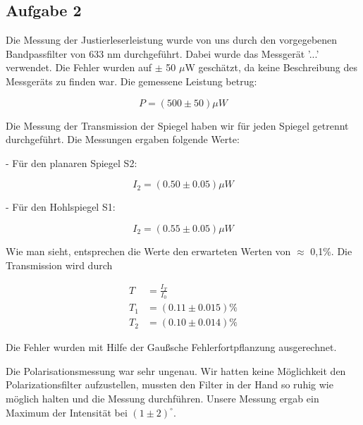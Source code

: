 \subsection{Aufgabe 2}

Die Messung der Justierleserleistung wurde von uns durch den vorgegebenen Bandpassfilter von 633 nm durchgeführt. Dabei wurde das Messgerät '...' verwendet. Die Fehler wurden auf $\pm$ 50 $\mu$W geschätzt, da keine Beschreibung des Messgeräts zu finden war. Die gemessene Leistung betrug:

\begin{equation}
P = (500 \pm 50) \mu W
\end{equation}

Die Messung der Transmission der Spiegel haben wir für jeden Spiegel getrennt durchgeführt. Die Messungen ergaben folgende Werte:

- Für den planaren Spiegel S2:

\begin{equation}
I_{2} = (0.50 \pm 0.05) \mu W
\end{equation}

- Für den Hohlspiegel S1:

\begin{equation}
	I_{2} = (0.55 \pm 0.05) \mu W
\end{equation}

Wie man sieht, entsprechen die Werte den erwarteten Werten von $\approx$ 0,1\%. Die Transmission wird durch 

\begin{align}
	T &= \frac{I_{T}}{I_{0}} \\
	T_{1} &= (0.11 \pm 0.015)\% \\
	T_{2} &= (0.10 \pm 0.014)\% 
\end{align}

Die Fehler wurden mit Hilfe der Gaußsche Fehlerfortpflanzung ausgerechnet.

Die Polarisationsmessung war sehr ungenau. Wir hatten keine Möglichkeit den Polarizationsfilter aufzustellen, mussten den Filter in der Hand so ruhig wie möglich halten und die Messung durchführen. Unsere Messung ergab ein Maximum der Intensität bei $(1 \pm 2)^{\circ}$.

